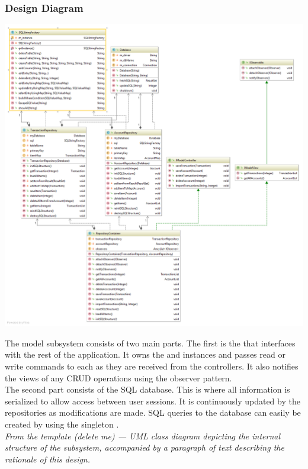 \documentclass[12pt]{article}
\begin{document}
\subsubsection{Design Diagram}

\includegraphics[width=\textwidth,height=\textheight,keepaspectratio]{Diagrams/UML/Model.png}
\bigskip

The model subsystem consists of two main parts. The first is the  that interfaces with the rest of the application. It owns the  and  instances and passes read or write commands to each as they are received from the controllers. It also notifies the views of any CRUD operations using the observer pattern.\\

The second part consists of the SQL database. This is where all information is serialized to allow access between user sessions. It is continuously updated by the repositories as modifications are made. SQL queries to the database can easily be created by using the singleton .\\

\textit {From the template (delete me) --- UML class diagram depicting the internal structure of the subsystem, accompanied by a paragraph of text describing the rationale of this design.}
\end{document}
